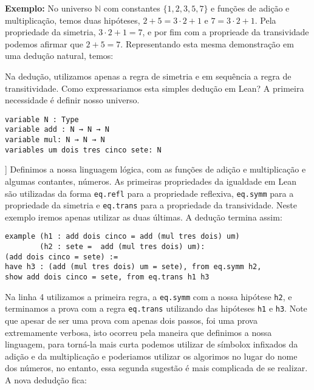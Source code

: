 \textbf{Exemplo:} No universo $\mathbb{N}$ com constantes $\{ 1, 2,3,5,7\}$ e funções de adição e 
multiplicação, temos duas hipóteses, $2+5 = 3 \cdot 2 +1$ e $7 = 3\cdot 2 +1$. 
Pela propriedade da simetria, $3\cdot 2 +1= 7$, e por fim com a proprieade da transividade podemos 
afirmar que $2+5 = 7$. Representando esta mesma demonstração em uma dedução natural, temos:
\begin{center}
    \begin{bprooftree}
    \end{bprooftree}
\end{center}
Na dedução, utilizamos apenas a regra de simetria e em sequência a regra de transitividade. Como 
expressariamos esta simples dedução em Lean? A primeira necessidade é definir nosso universo.
\begin{lstlisting}
variable N : Type
variable add : N → N → N
variable mul: N → N → N
variables um dois tres cinco sete: N
\end{lstlisting}]
Definimos a nossa linguagem lógica, com as funções de adição e multiplicação e algumas contantes, números. As 
primeiras propriedades da igualdade em Lean são utilizadas da forma \lstinline{eq.refl} para a propriedade
reflexiva, \lstinline{eq.symm} para a propriedade da simetria e \lstinline{eq.trans} para a propriedade 
da transividade. Neste exemplo iremos apenas utilizar as duas últimas. A dedução termina assim:
\begin{lstlisting}
example (h1 : add dois cinco = add (mul tres dois) um) 
        (h2 : sete =  add (mul tres dois) um):  
(add dois cinco = sete) :=
have h3 : (add (mul tres dois) um = sete), from eq.symm h2,
show add dois cinco = sete, from eq.trans h1 h3
\end{lstlisting}
Na linha 4 utilizamos a primeira regra, a \lstinline{eq.symm} com a nossa hipótese \lstinline{h2}, e terminamos
a prova com a regra \lstinline{eq.trans} utilizando das hipóteses \lstinline{h1} e \lstinline{h3}. Note que 
apesar de ser uma prova com apenas dois passos, foi uma prova extremamente verbosa, isto ocorreu pela 
maneira que definimos a nossa linguagem, para torná-la mais curta podemos utilizar de símbolox infixados
da adição e da multiplicação e poderiamos utilizar os algorimos no lugar do nome dos números, no entanto,
essa segunda sugestão é mais complicada de se realizar. A nova dedudção fica:
